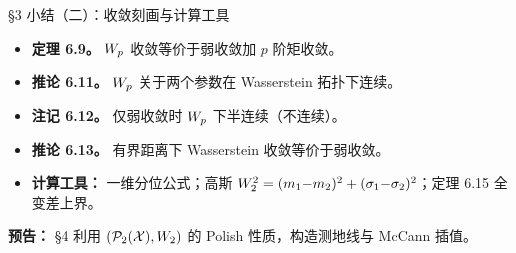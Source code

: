 \begin{frame}{§3 小结（二）：收敛刻画与计算工具}
  \begin{itemize}\small
    \item \textbf{定理 6.9。} $W_{p}$ 收敛等价于弱收敛加 $p$ 阶矩收敛。
    \item \textbf{推论 6.11。} $W_{p}$ 关于两个参数在 Wasserstein 拓扑下连续。
    \item \textbf{注记 6.12。} 仅弱收敛时 $W_{p}$ 下半连续（不连续）。
    \item \textbf{推论 6.13。} 有界距离下 Wasserstein 收敛等价于弱收敛。
    \item \textbf{计算工具：} 一维分位公式；高斯 $W_{2}^{2}=(m_1{-}m_2)^{2}+(\sigma_1{-}\sigma_2)^{2}$；定理 6.15 全变差上界。
  \end{itemize}

  \textbf{预告：} §4 利用 $(\mathcal{P}_{2}(\mathcal{X}),W_{2})$ 的 Polish 性质，构造测地线与 McCann 插值。

\end{frame}

